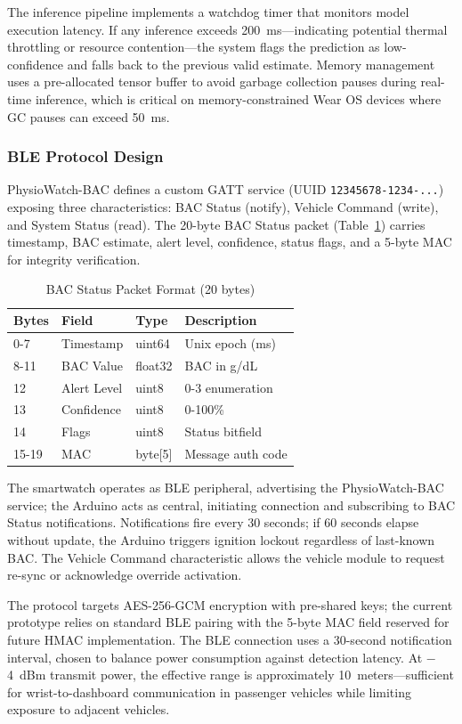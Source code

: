 \documentclass[HARVARD,Times2COL]{WileyNJDv5}
\begin{document}
The inference pipeline implements a watchdog timer that monitors model execution latency. If any inference exceeds 200~ms---indicating potential thermal throttling or resource contention---the system flags the prediction as low-confidence and falls back to the previous valid estimate. Memory management uses a pre-allocated tensor buffer to avoid garbage collection pauses during real-time inference, which is critical on memory-constrained Wear OS devices where GC pauses can exceed 50~ms.
\subsubsection{BLE Protocol Design}
PhysioWatch-BAC defines a custom GATT service (UUID \texttt{12345678-1234-...}) exposing three characteristics: BAC Status (notify), Vehicle Command (write), and System Status (read). The 20-byte BAC Status packet (Table~\ref{tab:bac_packet}) carries timestamp, BAC estimate, alert level, confidence, status flags, and a 5-byte MAC for integrity verification.

\begin{table}[htbp]
\caption{BAC Status Packet Format (20 bytes)}
\label{tab:bac_packet}
\centering
\small
\begin{tabular}{@{}llll@{}}
\toprule
\textbf{Bytes} & \textbf{Field} & \textbf{Type} & \textbf{Description} \\
\midrule
0-7 & Timestamp & uint64 & Unix epoch (ms) \\
8-11 & BAC Value & float32 & BAC in g/dL \\
12 & Alert Level & uint8 & 0-3 enumeration \\
13 & Confidence & uint8 & 0-100\% \\
14 & Flags & uint8 & Status bitfield \\
15-19 & MAC & byte[5] & Message auth code \\
\bottomrule
\end{tabular}
\end{table}

\par
The smartwatch operates as BLE peripheral, advertising the PhysioWatch-BAC service; the Arduino acts as central, initiating connection and subscribing to BAC Status notifications. Notifications fire every 30 seconds; if 60 seconds elapse without update, the Arduino triggers ignition lockout regardless of last-known BAC. The Vehicle Command characteristic allows the vehicle module to request re-sync or acknowledge override activation. \par
The protocol targets AES-256-GCM encryption with pre-shared keys; the current prototype relies on standard BLE pairing with the 5-byte MAC field reserved for future HMAC implementation. The BLE connection uses a 30-second notification interval, chosen to balance power consumption against detection latency. At $-$4~dBm transmit power, the effective range is approximately 10~meters---sufficient for wrist-to-dashboard communication in passenger vehicles while limiting exposure to adjacent vehicles.
\end{document}
